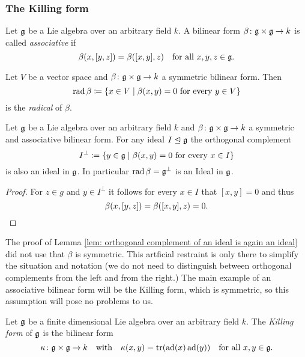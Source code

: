 \subsubsection{The Killing form}




\begin{defi}
 Let $\mathfrak{g}$ be a Lie algebra over an arbitrary field $k$. A bilinear form $\beta \colon \mathfrak{g} \times \mathfrak{g} \to k$ is called \emph{associative} if
 \[
  \beta(x,[y,z]) = \beta([x,y],z) \quad \text{for all $x,y,z \in \mathfrak{g}$}.
 \]
\end{defi}


\begin{defi}
 Let $V$ be a vector space and $\beta \colon \mathfrak{g} \times \mathfrak{g} \to k$ a symmetric bilinear form. Then
 \[
  \operatorname{rad} \beta \coloneqq \{x \in V \mid \text{$\beta(x,y) = 0$ for every $y \in V$}\}
 \]
 is the \emph{radical} of $\beta$.
\end{defi}


\begin{lem}\label{lem: orthogonal complement of an ideal is again an ideal}
 Let $\mathfrak{g}$ be a Lie algebra over an arbitrary field $k$ and \mbox{$\beta \colon \mathfrak{g} \times \mathfrak{g} \to k$} a symmetric and associative bilinear form. For any ideal $I \trianglelefteq \mathfrak{g}$ the orthogonal complement
 \[
  I^\perp \coloneqq \{y \in \mathfrak{g} \mid \text{$\beta(x,y) = 0$ for every $x \in I$}\}
 \]
 is also an ideal in $\mathfrak{g}$. In particular $\operatorname{rad} \beta = \mathfrak{g}^\perp$ is an Ideal in $\mathfrak{g}$.
\end{lem}
\begin{proof}
 For $z \in g$ and $y \in I^\perp$ it follows for every $x \in I$ that $[x,y] = 0$ and thus
 \[
  \beta(x,[y,z]) = \beta([x,y],z) = 0.
  \qedhere
 \]
\end{proof}


\begin{rem}
 The proof of Lemma \ref{lem: orthogonal complement of an ideal is again an ideal} did not use that $\beta$ is symmetric. This artficial restraint is only there to simplify the situation and notation (we do not need to distinguish between orthogonal complements from the left and from the right.) The main example of an associative bilinear form will be the Killing form, which is symmetric, so this assumption will pose no problems to us.
\end{rem}




\begin{defi}
 Let $\mathfrak{g}$ be a finite dimensional Lie algebra over an arbitrary field $k$. The \emph{Killing form} of $\mathfrak{g}$ is the bilinear form
 \[
  \kappa \colon \mathfrak{g} \times \mathfrak{g} \to k
  \quad\text{with}\quad
  \kappa(x,y) = \operatorname{tr}(\operatorname{ad}(x) \operatorname{ad}(y))
  \quad\text{for all $x,y \in \mathfrak{g}$}.
 \]
\end{defi}


